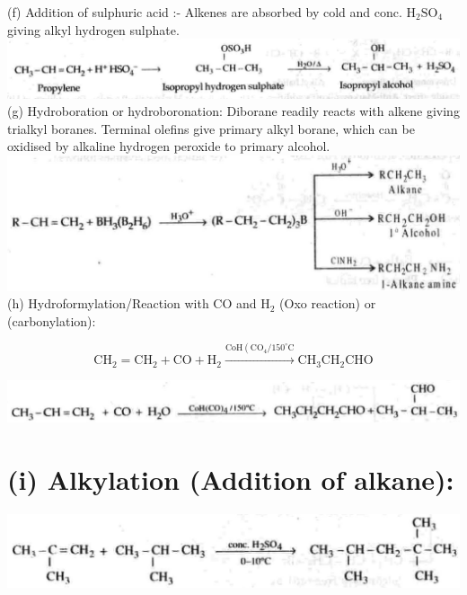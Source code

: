 \documentclass[10pt]{article}
\begin{document}
(f) Addition of sulphuric acid :- Alkenes are absorbed by cold and conc. $\mathrm{H}_{2} \mathrm{SO}_{4}$ giving alkyl hydrogen sulphate.\\
\includegraphics[max width=\textwidth, center]{2025_01_28_8470952b98110cec3aabg-182}\\
(g) Hydroboration or hydroboronation: Diborane readily reacts with alkene giving trialkyl boranes. Terminal olefins give primary alkyl borane, which can be oxidised by alkaline hydrogen peroxide to primary alcohol.\\
\includegraphics[max width=\textwidth, center]{2025_01_28_8470952b98110cec3aabg-182(5)}\\
(h) Hydroformylation/Reaction with CO and $\mathrm{H}_{2}$ (Oxo reaction) or (carbonylation):

$$
\mathrm{CH}_{2}=\mathrm{CH}_{2}+\mathrm{CO}+\mathrm{H}_{2} \xrightarrow{\mathrm{CoH}\left(\mathrm{CO}_{4} / 150^{\circ} \mathrm{C}\right.} \mathrm{CH}_{3} \mathrm{CH}_{2} \mathrm{CHO}
$$

\begin{center}
\includegraphics[max width=\textwidth]{2025_01_28_8470952b98110cec3aabg-182(4)}
\end{center}

\section*{(i) Alkylation (Addition of alkane):}
\begin{center}
\includegraphics[max width=\textwidth]{2025_01_28_8470952b98110cec3aabg-182(2)}
\end{center}
\end{document}
